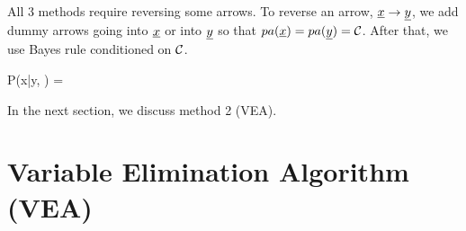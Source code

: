 \begin{itemize}
All 3 methods require  reversing some arrows. To reverse
an arrow, ${\underline{x}}\rightarrow {\underline{y}}$, we add dummy arrows going into ${\underline{x}}$ or into
${\underline{y}}$ so that $pa({\underline{x}})=pa({\underline{y}})= {\cal C}$. After that, we use Bayes rule conditioned on ${\cal C}$.


\beq
P(x|y, \calc) = 
\eeq




In the next section,
we discuss method 2 (VEA).

\end{itemize}

\section{Variable Elimination Algorithm (VEA)}


